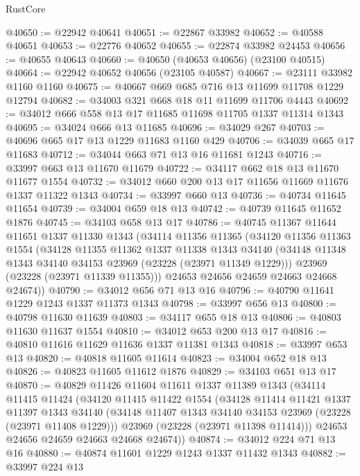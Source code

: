 \begin{lexlean}{RustCore}
\begin{coremodule}
@40650 := @22942 @40641
@40651 := @22867 @33982
@40652 := @40588 @40651
@40653 := @22776 @40652
@40655 := @22874 @33982 @24453
@40656 := @40655 @40643
@40660 := @40650 (@40653 @40656) (@23100 @40515)
@40664 := @22942 @40652 @40656 (@23105 @40587)
@40667 := @23111 @33982 @1160 @1160
@40675 := @40667 @669 @685 @716 @13 @11699 @11708 @1229 @12794
@40682 := @34003 @321 @668 @18 @11 @11699 @11706 @4443
@40692 := @34012 @666 @558 @13 @17 @11685 @11698 @11705 @1337 @11314 @1343
@40695 := @34024 @666 @13 @11685
@40696 := @34029 @267
@40703 := @40696 @665 @17 @13 @1229 @11683 @1160 @429
@40706 := @34039 @665 @17 @11683
@40712 := @34044 @663 @71 @13 @16 @11681 @1243
@40716 := @33997 @663 @13 @11670 @11679
@40722 := @34117 @662 @18 @13 @11670 @11677 @1554
@40732 := @34012 @660 @200 @13 @17 @11656 @11669 @11676 @1337 @11322 @1343
@40734 := @33997 @660 @13
@40736 := @40734 @11645 @11654
@40739 := @34004 @659 @18 @13
@40742 := @40739 @11645 @11652 @1876
@40745 := @34103 @658 @13 @17
@40786 := @40745
    @11367
    @11644
    @11651
    @1337
    @11330
    @1343
    (@34114
      @11356
      @11365
      (@34120
        @11356
        @11363
        @1554
        (@34128
          @11355
          @11362
          @1337
          @11338
          @1343
          @34140
          (@34148 @11348 @1343 @34140 @34153 @23969 (@23228 (@23971 @11349 @1229)))
          @23969
          (@23228 (@23971 @11339 @11355)))
        @24653
        @24656
        @24659
        @24663
        @24668
        @24674))
@40790 := @34012 @656 @71 @13 @16
@40796 := @40790 @11641 @1229 @1243 @1337 @11373 @1343
@40798 := @33997 @656 @13
@40800 := @40798 @11630 @11639
@40803 := @34117 @655 @18 @13
@40806 := @40803 @11630 @11637 @1554
@40810 := @34012 @653 @200 @13 @17
@40816 := @40810 @11616 @11629 @11636 @1337 @11381 @1343
@40818 := @33997 @653 @13
@40820 := @40818 @11605 @11614
@40823 := @34004 @652 @18 @13
@40826 := @40823 @11605 @11612 @1876
@40829 := @34103 @651 @13 @17
@40870 := @40829
    @11426
    @11604
    @11611
    @1337
    @11389
    @1343
    (@34114
      @11415
      @11424
      (@34120
        @11415
        @11422
        @1554
        (@34128
          @11414
          @11421
          @1337
          @11397
          @1343
          @34140
          (@34148 @11407 @1343 @34140 @34153 @23969 (@23228 (@23971 @11408 @1229)))
          @23969
          (@23228 (@23971 @11398 @11414)))
        @24653
        @24656
        @24659
        @24663
        @24668
        @24674))
@40874 := @34012 @224 @71 @13 @16
@40880 := @40874 @11601 @1229 @1243 @1337 @11432 @1343
@40882 := @33997 @224 @13

\end{coremodule}
\end{lexlean}
